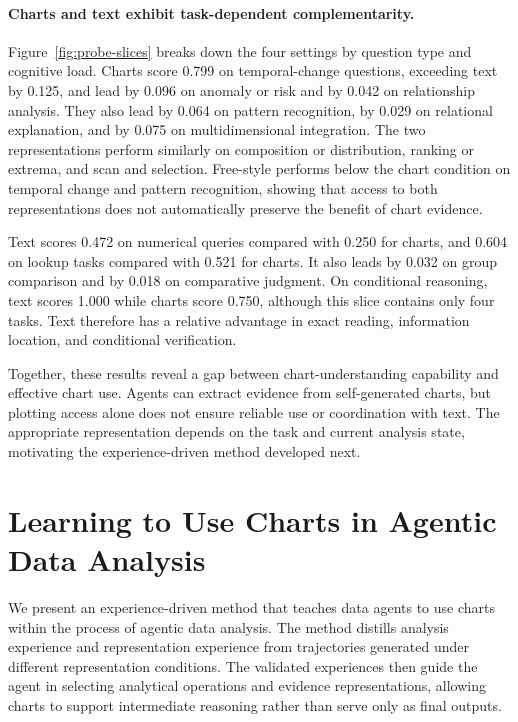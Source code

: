 \documentclass{article}
\begin{document}
\paragraph{Charts and text exhibit task-dependent complementarity.}
Figure~\ref{fig:probe-slices} breaks down the four settings by question type and cognitive load.
Charts score 0.799 on temporal-change questions, exceeding text by 0.125, and lead by 0.096 on anomaly or risk and by 0.042 on relationship analysis.
They also lead by 0.064 on pattern recognition, by 0.029 on relational explanation, and by 0.075 on multidimensional integration.
The two representations perform similarly on composition or distribution, ranking or extrema, and scan and selection.
Free-style performs below the chart condition on temporal change and pattern recognition, showing that access to both representations does not automatically preserve the benefit of chart evidence.

Text scores 0.472 on numerical queries compared with 0.250 for charts, and 0.604 on lookup tasks compared with 0.521 for charts.
It also leads by 0.032 on group comparison and by 0.018 on comparative judgment.
On conditional reasoning, text scores 1.000 while charts score 0.750, although this slice contains only four tasks.
Text therefore has a relative advantage in exact reading, information location, and conditional verification.

Together, these results reveal a gap between chart-understanding capability and effective chart use.
Agents can extract evidence from self-generated charts, but plotting access alone does not ensure reliable use or coordination with text.
The appropriate representation depends on the task and current analysis state, motivating the experience-driven method developed next.

\FloatBarrier
\section{Learning to Use Charts in Agentic Data Analysis}
\label{sec:method}

We present an experience-driven method that teaches data agents to use charts within the process of agentic data analysis.
The method distills analysis experience and representation experience from trajectories generated under different representation conditions.
The validated experiences then guide the agent in selecting analytical operations and evidence representations, allowing charts to support intermediate reasoning rather than serve only as final outputs.
\end{document}
